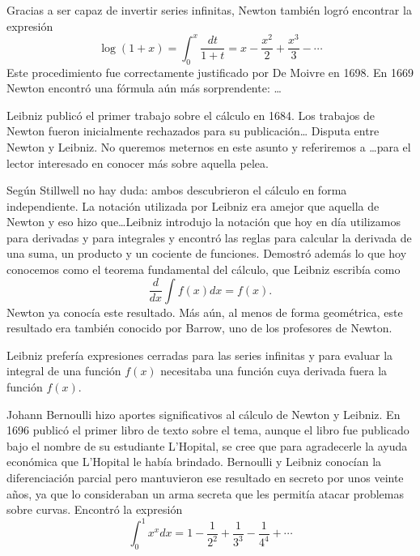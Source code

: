 Gracias a ser capaz de invertir series infinitas, Newton también logró encontrar la expresión
\[
	\log(1+x)=\int_0^x\dfrac{dt}{1+t}=x-\frac{x^2}{2}+\frac{x^3}{3}-\cdots
\]
Este procedimiento fue correctamente justificado por De Moivre en 1698.  
En 1669 Newton encontró una fórmula aún más sorprendente:
\dots

Leibniz publicó el primer trabajo sobre el cálculo en 1684. Los trabajos de Newton fueron inicialmente rechazados para su publicación\dots
Disputa entre Newton y Leibniz. No queremos meternos en este asunto y referiremos a \dots para el lector interesado 
en conocer más sobre aquella pelea. 

Según Stillwell no hay duda: ambos descubrieron el cálculo en forma
independiente. La notación utilizada por Leibniz era amejor que aquella de
Newton y eso hizo que\dots Leibniz introdujo la notación que hoy en día
utilizamos para derivadas y para integrales y encontró las reglas para calcular
la derivada de una suma, un producto y un cociente de funciones. Demostró
además lo que hoy conocemos como el teorema fundamental del cálculo, que
Leibniz escribía como
\[
	\frac{d}{dx}\int f(x)dx=f(x).
\]
Newton ya conocía este resultado. Más aún, al menos de forma geométrica, este resultado era también
conocido por Barrow, uno de los profesores de Newton. 

Leibniz prefería expresiones cerradas para las series infinitas y para evaluar la integral 
de una función $f(x)$ necesitaba una función cuya derivada fuera la función $f(x)$. 

Johann Bernoulli hizo aportes significativos al cálculo de Newton y Leibniz. En 1696 publicó el primer libro de texto sobre el tema, aunque 
el libro fue publicado bajo el nombre de su estudiante L'Hopital, se cree que 
para agradecerle la ayuda económica que L'Hopital le había brindado. Bernoulli y Leibniz conocían la diferenciación parcial pero
mantuvieron ese resultado en secreto por unos veinte años, ya que lo consideraban un arma secreta que les permitía atacar problemas sobre curvas. 
Encontró la expresión
\[
	\int_0^1 x^xdx=1-\frac{1}{2^2}+\frac{1}{3^3}-\frac{1}{4^4}+\cdots
\]

